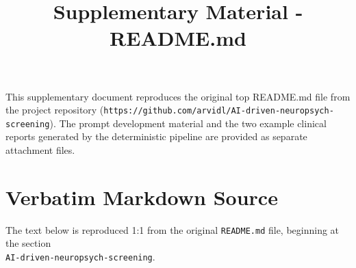 \documentclass[11pt]{article}
\title{Supplementary Material - README.md}
\author{}
\date{}
\begin{document}
\maketitle

\noindent This supplementary document reproduces the original top README.md file from the project repository (\texttt{https://github.com/arvidl/AI-driven-neuropsych-screening}). 
The prompt development material and the two example clinical reports generated by the deterministic pipeline are provided as separate attachment files.

\section*{Verbatim Markdown Source}

\noindent The text below is reproduced 1:1 from the original \texttt{README.md} file, beginning at the section \\
\texttt{AI-driven-neuropsych-screening}.

\bigskip


\end{document}
